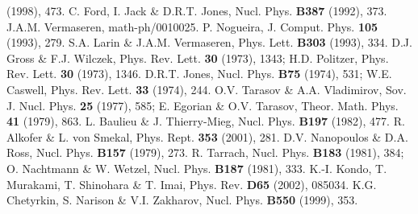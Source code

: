 \documentclass[a4paper,11pt]{article}
\begin{document}
\begin{thebibliography}{99}
(1998), 473.
 C. Ford, I. Jack \& D.R.T. Jones, Nucl. Phys. {\bf B387} (1992),
373. 
 J.A.M. Vermaseren, math-ph/0010025. 
 P. Nogueira, J. Comput. Phys. {\bf 105} (1993), 279. 
 S.A. Larin \& J.A.M. Vermaseren, Phys. Lett. {\bf B303} (1993), 
334. 
 D.J. Gross \& F.J. Wilczek, Phys. Rev. Lett. {\bf 30}
(1973), 1343; 
H.D. Politzer, Phys. Rev. Lett. {\bf 30} (1973), 1346.
 D.R.T. Jones, Nucl. Phys. {\bf B75} (1974), 531; 
W.E. Caswell, Phys. Rev. Lett. {\bf 33} (1974), 244. 
 O.V. Tarasov \& A.A. Vladimirov, Sov. J. Nucl. Phys. {\bf 25} 
(1977), 585;  
E. Egorian \& O.V. Tarasov, Theor. Math. Phys. {\bf 41} (1979), 863. 
 L. Baulieu \& J. Thierry-Mieg, Nucl. Phys. {\bf B197} (1982), 477. 
 R. Alkofer \& L. von Smekal, Phys. Rept. {\bf 353} (2001), 281. 
 D.V. Nanopoulos \& D.A. Ross, Nucl. Phys. {\bf B157} (1979), 273. 
 R. Tarrach, Nucl. Phys. {\bf B183} (1981), 384; 
O. Nachtmann \& W. Wetzel, Nucl. Phys. {\bf B187} (1981), 333. 
 K.-I. Kondo, T. Murakami, T. Shinohara \& T. Imai, Phys. Rev. 
{\bf D65} (2002), 085034.  
 K.G. Chetyrkin, S. Narison \& V.I. Zakharov, Nucl. Phys. {\bf 
B550} (1999), 353. 
\end{thebibliography}
\end{document}
